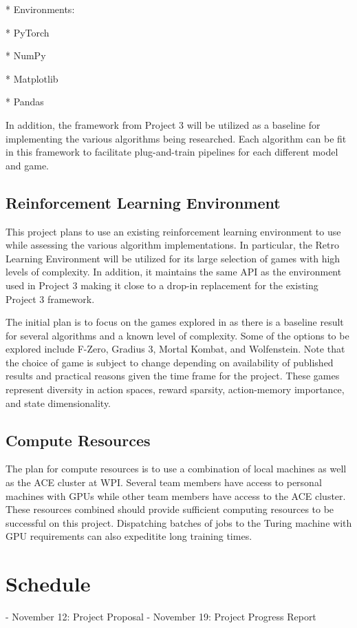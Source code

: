\documentclass[conference]{IEEEtran}
\begin{document}
* Environments: \cite{bhonker2017playing}

* PyTorch

* NumPy

* Matplotlib

* Pandas

In addition, the framework from Project 3 will be utilized as a baseline for implementing the various algorithms being researched. Each algorithm can be fit in this framework to facilitate plug-and-train pipelines for each different model and game.

\subsection{Reinforcement Learning Environment}
This project plans to use an existing reinforcement learning environment to use while assessing the various algorithm implementations.
In particular, the Retro Learning Environment \cite{bhonker2017playing} will be utilized for its large selection of games with high levels of complexity.
In addition, it maintains the same API as the environment used in Project 3 making it close to a drop-in replacement for the existing Project 3 framework.

The initial plan is to focus on the games explored in \cite{bhonker2017playing} as there is a baseline result for several algorithms and a known level of complexity.
Some of the options to be explored include F-Zero, Gradius 3, Mortal Kombat, and Wolfenstein.
Note that the choice of game is subject to change depending on availability of published results and practical reasons given the time frame for the project.
These games represent diversity in action spaces, reward sparsity, action-memory importance, and state dimensionality.

\subsection{Compute Resources}
The plan for compute resources is to use a combination of local machines as well as the ACE cluster at WPI.
Several team members have access to personal machines with GPUs while other team members have access to the ACE cluster.
These resources combined should provide sufficient computing resources to be successful on this project.
Dispatching batches of jobs to the Turing machine with GPU requirements can also expeditite long training times.

\section{Schedule}
\begin{enumerate}
- November 12: Project Proposal
- November 19: Project Progress Report
\end{enumerate}
\end{document}
